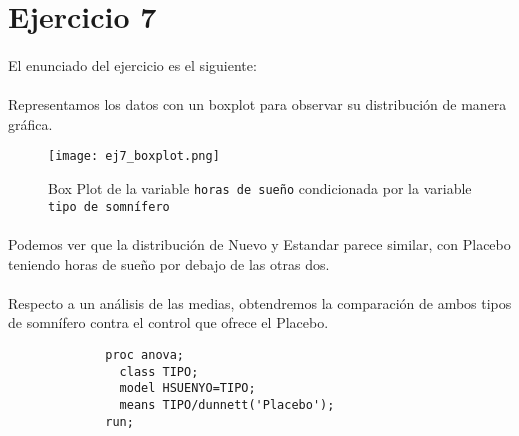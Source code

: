 \documentclass{article}
\begin{document}
  \maketitle

  \section{Ejercicio 7}

    \paragraph{}
    El enunciado del ejercicio es el siguiente: 

    \paragraph{}
    Representamos los datos con un boxplot para observar su distribución de manera gráfica.

    \begin{figure}[H]
      \centering
      \texttt{[image: ej7\_boxplot.png]}
      \caption{Box Plot de la variable \texttt{horas de sueño} condicionada por la variable \texttt{tipo de somnífero}}
      \label{fig:7_figura_1}
    \end{figure}

    \paragraph{}
     Podemos ver que la distribución de Nuevo y Estandar parece similar, con Placebo teniendo horas de sueño por debajo de las otras dos.

    \paragraph{}
    Respecto a un análisis de las medias, obtendremos la comparación de ambos tipos de somnífero contra el control que ofrece el Placebo.

    \begin{figure}[h]
			\centering
      \begin{verbatim}
        proc anova;
          class TIPO;
          model HSUENYO=TIPO;
          means TIPO/dunnett('Placebo');
        run;
      \end{verbatim}
			\label{code:sas_1}
		\end{figure}
\end{document}
